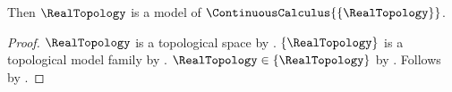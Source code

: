 


\begin{theorem}\label{closed_calculus_model_import_probe}
    Then $\RealTopology$ is a model of $\ContinuousCalculus{\{\RealTopology\}}$.
\end{theorem}
\begin{proof}
    $\RealTopology$ is a topological space by .
    $\{\RealTopology\}$ is a topological model family by .
    $\RealTopology\in\{\RealTopology\}$ by .
    Follows by .
\end{proof}
